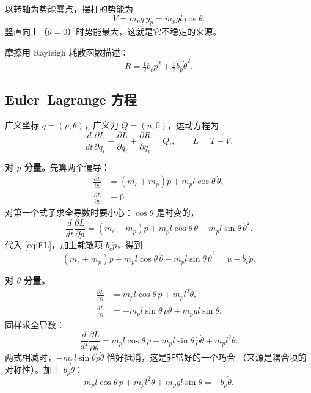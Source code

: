 以转轴为势能零点，摆杆的势能为
\begin{equation}
  V = m_p g\, y_p = m_p g l\cos\theta .
  \label{eq:V}
\end{equation}
竖直向上（$\theta=0$）时势能最大，这就是它不稳定的来源。

摩擦用 Rayleigh 耗散函数描述：
\begin{equation}
  R = \tfrac12 b_c \dot p^2 + \tfrac12 b_p \dot\theta^2 .
  \label{eq:R}
\end{equation}

\subsection{Euler--Lagrange 方程}

广义坐标 $q=(p,\theta)$，广义力 $Q=(u,0)$，运动方程为
\begin{equation}
  \frac{d}{dt}\frac{\partial L}{\partial \dot q_i}
  -\frac{\partial L}{\partial q_i}
  +\frac{\partial R}{\partial \dot q_i} = Q_i,
  \qquad L = T - V .
  \label{eq:EL}
\end{equation}

\textbf{对 $p$ 分量。}先算两个偏导：
\begin{align}
  \frac{\partial L}{\partial \dot p}
    &= (m_c+m_p)\dot p + m_p l\cos\theta\,\dot\theta, \\
  \frac{\partial L}{\partial p} &= 0 .
\end{align}
对第一个式子求全导数时要小心：$\cos\theta$ 是时变的，
\begin{equation}
  \frac{d}{dt}\frac{\partial L}{\partial \dot p}
  = (m_c+m_p)\ddot p + m_p l\cos\theta\,\ddot\theta
    - m_p l\sin\theta\,\dot\theta^2 .
\end{equation}
代入 \eqref{eq:EL}，加上耗散项 $b_c\dot p$，得到
\begin{equation}
  (m_c+m_p)\ddot p + m_p l\cos\theta\,\ddot\theta
  - m_p l\sin\theta\,\dot\theta^2 = u - b_c\dot p .
  \label{eq:eqA}
\end{equation}

\textbf{对 $\theta$ 分量。}
\begin{align}
  \frac{\partial L}{\partial \dot\theta}
    &= m_p l\cos\theta\,\dot p + m_p l^2\dot\theta,\\
  \frac{\partial L}{\partial \theta}
    &= -m_p l\sin\theta\,\dot p\dot\theta + m_p g l\sin\theta .
\end{align}
同样求全导数：
\begin{equation}
  \frac{d}{dt}\frac{\partial L}{\partial \dot\theta}
  = m_p l\cos\theta\,\ddot p
    - m_p l\sin\theta\,\dot p\dot\theta + m_p l^2\ddot\theta .
\end{equation}
两式相减时，$-m_p l\sin\theta\dot p\dot\theta$ 恰好抵消，这是非常好的一个巧合
（来源是耦合项的对称性）。加上 $b_p\dot\theta$：
\begin{equation}
  m_p l\cos\theta\,\ddot p + m_p l^2\ddot\theta
  + m_p g l\sin\theta = -b_p\dot\theta .
  \label{eq:eqB}
\end{equation}

